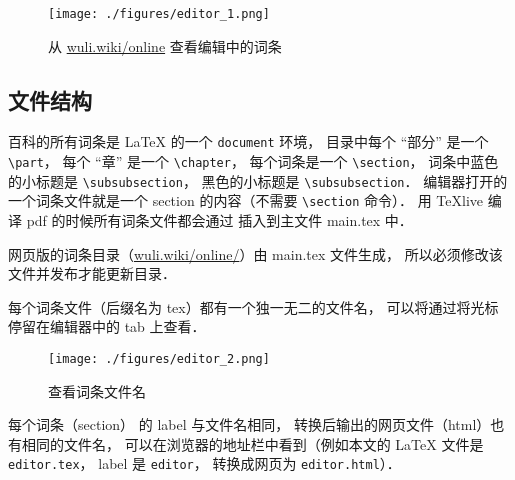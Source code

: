 \begin{figure}[ht]
\centering
\texttt{[image: ./figures/editor\_1.png]}
\caption{从 \href{http://wuli.wiki/online}{wuli.wiki/online} 查看编辑中的词条} \label{editor_fig1}
\end{figure}

\subsection{文件结构}

百科的所有词条是 LaTeX 的一个 \verb|document| 环境， 目录中每个 “部分” 是一个 \verb|\part|， 每个 “章” 是一个 \verb|\chapter|， 每个词条是一个 \verb|\section|， 词条中蓝色的小标题是 \verb|\subsubsection|， 黑色的小标题是 \verb|\subsubsection|． 编辑器打开的一个词条文件就是一个 section 的内容（不需要 \verb|\section| 命令）． 用 TeXlive 编译 pdf 的时候所有词条文件都会通过 \verb|| 插入到主文件 main.tex 中．

网页版的词条目录（\href{http://wuli.wiki/online/}{wuli.wiki/online/}）由 main.tex 文件生成， 所以必须修改该文件并发布才能更新目录．

每个词条文件（后缀名为 tex）都有一个独一无二的文件名， 可以将通过将光标停留在编辑器中的 tab 上查看．

\begin{figure}[ht]
\centering
\texttt{[image: ./figures/editor\_2.png]}
\caption{查看词条文件名} \label{editor_fig2}
\end{figure}

每个词条（section） 的 label 与文件名相同， 转换后输出的网页文件（html）也有相同的文件名， 可以在浏览器的地址栏中看到（例如本文的 LaTeX 文件是 \verb|editor.tex|， label 是 \verb|editor|， 转换成网页为 \verb|editor.html|）．

